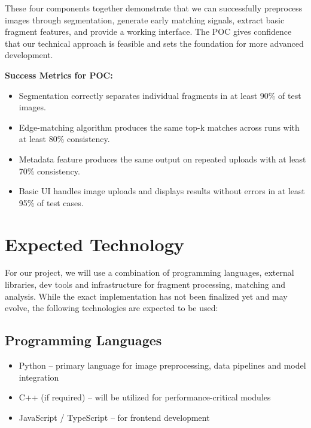 \documentclass{article}
\begin{document}
These four components together demonstrate that we can successfully preprocess images through segmentation, generate early matching signals, extract basic fragment features, and provide a working interface. The POC gives confidence that our technical approach is feasible and sets the foundation for more advanced development.

\textbf{Success Metrics for POC:}

\begin{itemize}
\item Segmentation correctly separates individual fragments in at least 90\% of test images.
\item Edge-matching algorithm produces the same top-k matches across runs with at least 80\% consistency.
\item Metadata feature produces the same output on repeated uploads with at least 70\% consistency.
\item Basic UI handles image uploads and displays results without errors in at least 95\% of test cases.
\end{itemize}

\section{Expected Technology}

\noindent For our project, we will use a combination of programming languages, external libraries, dev tools and infrastructure for fragment processing, matching and analysis. While the exact implementation has not been finalized yet and may evolve, the following technologies are expected to be used:

\subsection*{Programming Languages}
\begin{itemize}
    \item Python -- primary language for image preprocessing, data pipelines and model integration
    \item C++ (if required) -- will be utilized for performance-critical modules
    \item JavaScript / TypeScript -- for frontend development
\end{itemize}
\end{document}
